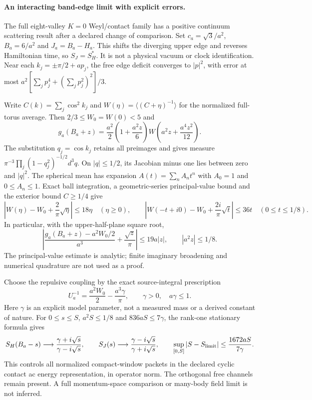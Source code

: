 \paragraph{An interacting band-edge limit with explicit errors.}
The full eight-valley $K=0$ Weyl/contact family has a positive continuum
scattering result after a declared change of comparison. Set
$c_a=\sqrt3/a^2$, $B_a=6/a^2$ and $J_a=B_a-H_a$. This shifts the diverging
upper edge and reverses Hamiltonian time, so $S_J=S_H^*$.
It is not a physical vacuum or clock identification. Near each
$k_j=\pm\pi/2+ap_j$, the free edge deficit converges to $|p|^2$, with error
at most $a^2[\sum_jp_j^4+(\sum_jp_j^2)^2]/3$.

Write $C(k)=\sum_j\cos^2 k_j$ and $W(\eta)=\langle(C+\eta)^{-1}\rangle$
for the normalized full-torus average. Then $2/3\leq W_0=W(0)<5$ and
\[
 g_a(B_a+z)=\frac{a^2}{2}\left(1+\frac{a^2z}{6}\right)
 W\left(a^2z+\frac{a^4z^2}{12}\right).
\]
The substitution $q_j=\cos k_j$ retains all preimages and gives measure
$\pi^{-3}\prod_j(1-q_j^2)^{-1/2}d^3q$. On $|q|\leq1/2$, its Jacobian
minus one lies between zero and $|q|^2$. The spherical mean has expansion
$A(t)=\sum_n A_nt^n$ with $A_0=1$ and $0\leq A_n\leq1$.
Exact ball integration, a geometric-series principal-value bound and
the exterior bound $C\geq1/4$ give
\[
 \left|W(\eta)-W_0+\frac2\pi\sqrt\eta\right|\leq18\eta
 \quad(\eta\geq0),\qquad
 \left|W(-t+i0)-W_0+\frac{2i}\pi\sqrt t\right|\leq36t
 \quad(0\leq t\leq1/8).
\]
In particular, with the upper-half-plane square root,
\[
 \left|\frac{g_a(B_a+z)-a^2W_0/2}{a^3}
          +\frac{\sqrt z}{\pi}\right|\leq19a|z|,
 \qquad |a^2z|\leq1/8.
\]
The principal-value estimate is analytic; finite imaginary broadening
and numerical quadrature are not used as a proof.

Choose the repulsive coupling by the exact source-integral prescription
\[
 U_a^{-1}=\frac{a^2W_0}{2}-\frac{a^3\gamma}{\pi},\qquad
 \gamma>0,\quad a\gamma\leq1.
\]
Here $\gamma$ is an explicit model parameter, not a measured mass or a
derived constant of nature. For $0\leq s\leq S$, $a^2S\leq1/8$ and
$836aS\leq7\gamma$, the rank-one stationary formula gives
\[
 S_H(B_a-s)\longrightarrow\frac{\gamma+i\sqrt s}{\gamma-i\sqrt s},
 \qquad
 S_J(s)\longrightarrow\frac{\gamma-i\sqrt s}{\gamma+i\sqrt s},
 \qquad
 \sup_{[0,S]}|S-S_{\rm limit}|\leq\frac{1672aS}{7\gamma}.
\]
This controls all normalized compact-window packets in the declared
cyclic contact ac energy representation, in operator norm. The
orthogonal free channels remain present. A full momentum-space
comparison or many-body field limit is not inferred.


